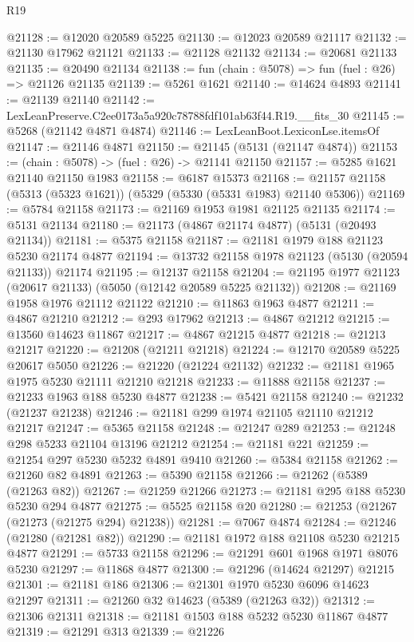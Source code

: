 \begin{lexlean}{R19}
\begin{coremodule}
@21128 := @12020 @20589 @5225
@21130 := @12023 @20589 @21117
@21132 := @21130 @17962 @21121
@21133 := @21128 @21132
@21134 := @20681 @21133
@21135 := @20490 @21134
@21138 := fun (chain : @5078) => fun (fuel : @26) => @21126 @21135
@21139 := @5261 @1621
@21140 := @14624 @4893
@21141 := @21139 @21140
@21142 := LexLeanPreserve.C2ee0173a5a920c78788fdf101ab63f44.R19.__fits_30
@21145 := @5268 (@21142 @4871 @4874)
@21146 := LexLeanBoot.LexiconLse.itemsOf
@21147 := @21146 @4871
@21150 := @21145 (@5131 (@21147 @4874))
@21153 := (chain : @5078) -> (fuel : @26) -> @21141 @21150
@21157 := @5285 @1621 @21140 @21150 @1983
@21158 := @6187 @15373
@21168 := @21157 @21158 (@5313 (@5323 @1621)) (@5329 (@5330 (@5331 @1983) @21140 @5306))
@21169 := @5784 @21158
@21173 := @21169 @1953 @1981 @21125 @21135
@21174 := @5131 @21134
@21180 := @21173 (@4867 @21174 @4877) (@5131 (@20493 @21134))
@21181 := @5375 @21158
@21187 := @21181 @1979 @188 @21123 @5230 @21174 @4877
@21194 := @13732 @21158 @1978 @21123 (@5130 (@20594 @21133)) @21174
@21195 := @12137 @21158
@21204 := @21195 @1977 @21123 (@20617 @21133) (@5050 (@12142 @20589 @5225 @21132))
@21208 := @21169 @1958 @1976 @21112 @21122
@21210 := @11863 @1963 @4877
@21211 := @4867 @21210
@21212 := @293 @17962
@21213 := @4867 @21212
@21215 := @13560 @14623 @11867
@21217 := @4867 @21215 @4877
@21218 := @21213 @21217
@21220 := @21208 (@21211 @21218)
@21224 := @12170 @20589 @5225 @20617 @5050
@21226 := @21220 (@21224 @21132)
@21232 := @21181 @1965 @1975 @5230 @21111 @21210 @21218
@21233 := @11888 @21158
@21237 := @21233 @1963 @188 @5230 @4877
@21238 := @5421 @21158
@21240 := @21232 (@21237 @21238)
@21246 := @21181 @299 @1974 @21105 @21110 @21212 @21217
@21247 := @5365 @21158
@21248 := @21247 @289
@21253 := @21248 @298 @5233 @21104 @13196 @21212
@21254 := @21181 @221
@21259 := @21254 @297 @5230 @5232 @4891 @9410
@21260 := @5384 @21158
@21262 := @21260 @82 @4891
@21263 := @5390 @21158
@21266 := @21262 (@5389 (@21263 @82))
@21267 := @21259 @21266
@21273 := @21181 @295 @188 @5230 @5230 @294 @4877
@21275 := @5525 @21158 @20
@21280 := @21253 (@21267 (@21273 (@21275 @294) @21238))
@21281 := @7067 @4874
@21284 := @21246 (@21280 (@21281 @82))
@21290 := @21181 @1972 @188 @21108 @5230 @21215 @4877
@21291 := @5733 @21158
@21296 := @21291 @601 @1968 @1971 @8076 @5230
@21297 := @11868 @4877
@21300 := @21296 (@14624 @21297) @21215
@21301 := @21181 @186
@21306 := @21301 @1970 @5230 @6096 @14623 @21297
@21311 := @21260 @32 @14623 (@5389 (@21263 @32))
@21312 := @21306 @21311
@21318 := @21181 @1503 @188 @5232 @5230 @11867 @4877
@21319 := @21291 @313
@21339 := @21226

\end{coremodule}
\end{lexlean}

